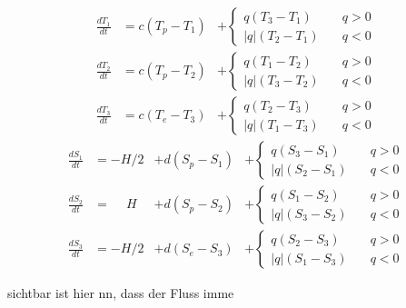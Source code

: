 \begin{equation}
\begin{aligned}
\frac{dT_1}{dt} &= c(T_p-T_1)&+ \begin{cases} q(T_3-T_1) & \quad q>0 \\ |q|(T_2-T_1) & \quad q<0 \end{cases}
\\
\frac{dT_2}{dt} &= c(T_p-T_2)&+\begin{cases} q(T_1-T_2) & \quad q>0 \\ |q|(T_3-T_2) & \quad q<0 \end{cases}
\\
\frac{dT_3}{dt} &= c(T_e-T_3)&+\begin{cases} q(T_2-T_3) & \quad q>0 \\ |q|(T_1-T_3) & \quad q<0 \end{cases}
\end{aligned}
\end{equation}
\begin{equation}
\begin{aligned}
\frac{dS_1}{dt} &= -H/2 &+ d(S_p-S_1)&+\begin{cases} q(S_3-S_1) & \quad q>0 \\ |q|(S_2-S_1) & \quad q<0 \end{cases}
\\
\frac{dS_2}{dt} &= \phantom{-}H &+ d(S_p-S_2)&+\begin{cases} q(S_1-S_2) & \quad q>0 \\ |q|(S_3-S_2) & \quad q<0 \end{cases}	
\\
\frac{dS_3}{dt} &= -H/2 &+d(S_e-S_3)&+\begin{cases} q(S_2-S_3) & \quad q>0 \\ |q|(S_1-S_3) & \quad q<0 \end{cases}
\end{aligned}
\end{equation}	

sichtbar ist hier nn, dass der Fluss imme

